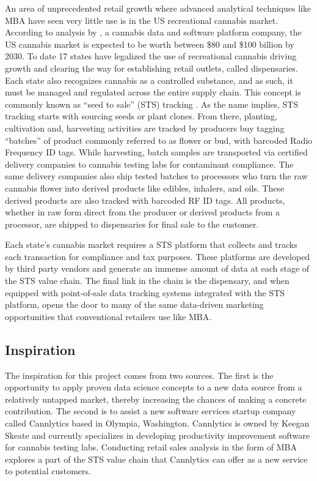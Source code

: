 \documentclass[../article.tex, 12pt]{subfiles}
\begin{document}
\begin{multicols*}{2}
\par
An area of unprecedented retail growth where advanced analytical techniques like MBA have seen very little use is in the US recreational cannabis market. According to analysis by \citep{flowhub2021}, a cannabis data and software platform company, the US cannabis market is expected to be worth between \$80 and \$100 billion by 2030. To date 17 states have legalized the use of recreational cannabis driving growth and clearing the way for establishing retail outlets, called dispensaries. Each state also recognizes cannabis as a controlled substance, and as such, it must be managed and regulated across the entire supply chain. This concept is commonly known as ``seed to sale'' (STS) tracking \citep{kees2020evidence}. As the name implies, STS tracking starts with sourcing seeds or plant clones. From there, planting, cultivation and, harvesting activities are tracked by producers buy tagging ``batches'' of product commonly referred to as flower or bud, with barcoded Radio Frequency ID tags. While harvesting, batch samples are transported via certified delivery companies to cannabis testing labs for contaminant compliance. The same delivery companies also ship tested batches to processors who turn the raw cannabis flower into derived products like edibles, inhalers, and oils. These derived products are also tracked with barcoded RF ID tags. All products, whether in raw form direct from the producer or derived products from a processor, are shipped to dispensaries for final sale to the customer.

\par
Each state's cannabis market requires a STS platform that collects and tracks each transaction for compliance and tax purposes. These platforms are developed by third party vendors and generate an immense amount of data at each stage of the STS value chain. The final link in the chain is the dispensary, and when equipped with point-of-sale data tracking systems integrated with the STS platform, opens the door to many of the same data-driven marketing opportunities that conventional retailers use like MBA.

\pagestyle{regular}

\subsection{Inspiration}

The inspiration for this project comes from two sources. The first is the opportunity to apply proven data science concepts to a new data source from a relatively untapped market, thereby increasing the chances of making a concrete contribution. The second is to assist a new software services startup company called Cannlytics based in Olympia, Washington. Cannlytics is owned by Keegan Skeate and currently specializes in developing productivity improvement software for cannabis testing labs. Conducting retail sales analysis in the form of MBA explores a part of the STS value chain that Cannlytics can offer as a new service to potential customers.


\end{multicols*}
\end{document}
